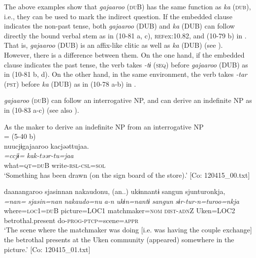 The above examples show that \textit{gajaaroo} (\textsc{du}B) has the same function as \textit{ka} (\textsc{dub}), i.e., they can be used to mark the indirect question. If the embedded clause indicates the non-past tense, both \textit{gajaaroo} (DUB) and \textit{ka} (DUB) can follow directly the bound verbal stem as in (10-81 a, c), \textsc{ref}{ex:10.82}, and (10-79 b) in . That is, \textit{gajaaroo} (DUB) is an affix-like clitic as well as \textit{ka} (DUB) (see ). However, there is a difference between them. On the one hand, if the embedded clause indicates the past tense, the verb takes \textit{{}-tɨ} (\textsc{seq}) before \textit{gajaaroo} (DUB) as in (10-81 b, d). On the other hand, in the same environment, the verb takes \textit{{}-tar} (\textsc{pst}) before \textit{ka} (DUB) as in (10-78 a-b) in .

  \textit{gajaaroo} (\textsc{du}B) can follow an interrogative NP, and can derive an indefinite NP as in (10-83 a-c) (see also ).

\ea\label{ex:10.83}   As the maker to derive an indefinite NP from an interrogative NP\\
  \ea{} = (5-40 b)\\
      \glll    nuucjɨgajaaroo  kacjəəttujaa.\\
      \textit{=ccjɨ=}  \textit{kak-təər-tu=jaa}\\
      what=\textsc{qt}=\textsc{du}B  write-\textsc{rsl}-\textsc{csl}=\textsc{sol}\\
      \glt       ‘Something has been drawn (on the sign board of the store).’ [Co: 120415\_00.txt]

  \ex  %
      \glll    daanangaroo  sjasinnan  {\textbar}nakaudo{\textbar}nu,  (an..)  ukɨnnantɨ  sangun  sjunturonkja,\\
      \textit{=nan=}  \textit{sjasin=nan}  \textit{nakaudo=nu}  \textit{a-n}  \textit{ukɨn=nantɨ}  \textit{sangun}  \textit{sɨr-tur-n=turoo=nkja}\\
      where=\textsc{loc}1=\textsc{du}B  picture=LOC1  matchmaker=\textsc{nom}  \textsc{dist}-\textsc{adn}Z  Uken=LOC2  betrothal.present  do-\textsc{prog}-\textsc{ptcp}=scene=\textsc{appr}\\
      \glt       ‘The scene where the matchmaker was doing [i.e. was having the couple exchange] the betrothal presents at the Uken community (appeared) somewhere in the picture.’ [Co: 120415\_01.txt]

